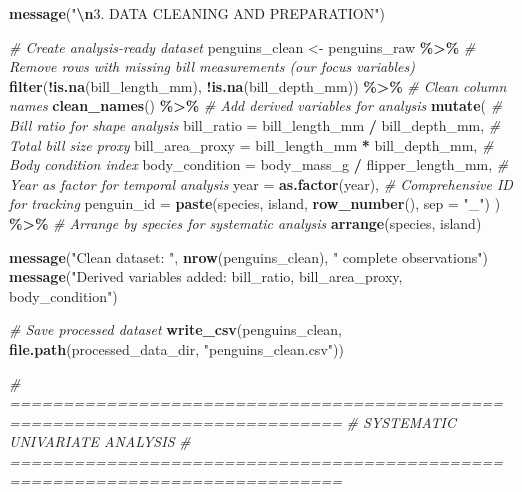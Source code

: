 \documentclass[
]{article}
\newenvironment{Shaded}{\begin{snugshade}}{\end{snugshade}}
\newcommand{\AttributeTok}[1]{\textcolor[rgb]{0.13,0.29,0.53}{#1}}
\newcommand{\CommentTok}[1]{\textcolor[rgb]{0.56,0.35,0.01}{\textit{#1}}}
\newcommand{\FunctionTok}[1]{\textcolor[rgb]{0.13,0.29,0.53}{\textbf{#1}}}
\newcommand{\NormalTok}[1]{#1}
\newcommand{\OtherTok}[1]{\textcolor[rgb]{0.56,0.35,0.01}{#1}}
\newcommand{\SpecialCharTok}[1]{\textcolor[rgb]{0.81,0.36,0.00}{\textbf{#1}}}
\newcommand{\StringTok}[1]{\textcolor[rgb]{0.31,0.60,0.02}{#1}}
\begin{document}
\begin{Shaded}
\begin{Highlighting}[]
\FunctionTok{message}\NormalTok{(}\StringTok{"}\SpecialCharTok{\textbackslash{}n}\StringTok{3. DATA CLEANING AND PREPARATION"}\NormalTok{)}

\CommentTok{\# Create analysis{-}ready dataset}
\NormalTok{penguins\_clean }\OtherTok{\textless{}{-}}\NormalTok{ penguins\_raw }\SpecialCharTok{\%\textgreater{}\%}
  \CommentTok{\# Remove rows with missing bill measurements (our focus variables)}
  \FunctionTok{filter}\NormalTok{(}\SpecialCharTok{!}\FunctionTok{is.na}\NormalTok{(bill\_length\_mm), }\SpecialCharTok{!}\FunctionTok{is.na}\NormalTok{(bill\_depth\_mm)) }\SpecialCharTok{\%\textgreater{}\%}
  \CommentTok{\# Clean column names}
  \FunctionTok{clean\_names}\NormalTok{() }\SpecialCharTok{\%\textgreater{}\%}
  \CommentTok{\# Add derived variables for analysis}
  \FunctionTok{mutate}\NormalTok{(}
    \CommentTok{\# Bill ratio for shape analysis}
    \AttributeTok{bill\_ratio =}\NormalTok{ bill\_length\_mm }\SpecialCharTok{/}\NormalTok{ bill\_depth\_mm,}
    \CommentTok{\# Total bill size proxy}
    \AttributeTok{bill\_area\_proxy =}\NormalTok{ bill\_length\_mm }\SpecialCharTok{*}\NormalTok{ bill\_depth\_mm,}
    \CommentTok{\# Body condition index}
    \AttributeTok{body\_condition =}\NormalTok{ body\_mass\_g }\SpecialCharTok{/}\NormalTok{ flipper\_length\_mm,}
    \CommentTok{\# Year as factor for temporal analysis}
    \AttributeTok{year =} \FunctionTok{as.factor}\NormalTok{(year),}
    \CommentTok{\# Comprehensive ID for tracking}
    \AttributeTok{penguin\_id =} \FunctionTok{paste}\NormalTok{(species, island, }\FunctionTok{row\_number}\NormalTok{(), }\AttributeTok{sep =} \StringTok{"\_"}\NormalTok{)}
\NormalTok{  ) }\SpecialCharTok{\%\textgreater{}\%}
  \CommentTok{\# Arrange by species for systematic analysis}
  \FunctionTok{arrange}\NormalTok{(species, island)}

\FunctionTok{message}\NormalTok{(}\StringTok{"Clean dataset: "}\NormalTok{, }\FunctionTok{nrow}\NormalTok{(penguins\_clean), }\StringTok{" complete observations"}\NormalTok{)}
\FunctionTok{message}\NormalTok{(}\StringTok{"Derived variables added: bill\_ratio, bill\_area\_proxy, body\_condition"}\NormalTok{)}

\CommentTok{\# Save processed dataset}
\FunctionTok{write\_csv}\NormalTok{(penguins\_clean, }\FunctionTok{file.path}\NormalTok{(processed\_data\_dir, }\StringTok{"penguins\_clean.csv"}\NormalTok{))}

\CommentTok{\# =============================================================================}
\CommentTok{\# SYSTEMATIC UNIVARIATE ANALYSIS}
\CommentTok{\# =============================================================================}


\end{Highlighting}
\end{Shaded}
\end{document}
